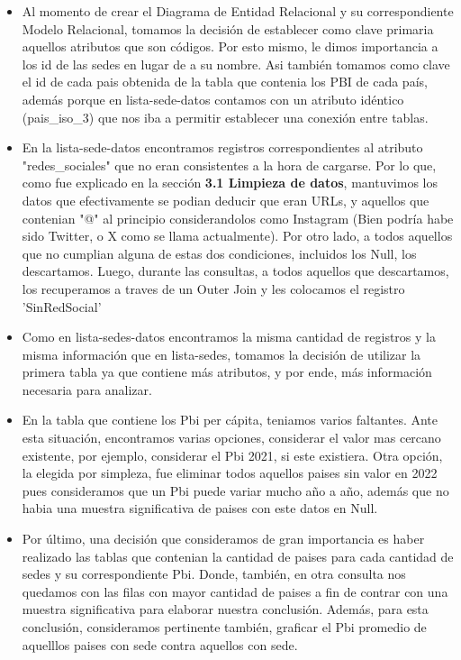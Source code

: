\documentclass[10pt,a4paper]{article}
\begin{document}
\begin{itemize}

    	\item Al momento de crear el Diagrama de Entidad Relacional y su correspondiente Modelo Relacional, tomamos la decisión de establecer como clave primaria aquellos atributos que son códigos. Por esto mismo, le dimos importancia a los id de las sedes en lugar de a su nombre. Asi también tomamos como clave el id de cada pais obtenida de la tabla que contenia los PBI de cada país, además porque en lista-sede-datos contamos con un atributo idéntico (pais\_iso\_3) que nos iba a permitir establecer una conexión entre tablas.

    	\item En la lista-sede-datos encontramos registros correspondientes al atributo "redes\_sociales" que no eran consistentes a la hora de cargarse. Por lo que, como fue explicado en la sección \textbf{3.1 Limpieza de datos}, mantuvimos los datos que efectivamente se podian deducir que eran URLs, y aquellos que contenian "@" al principio considerandolos como Instagram (Bien podría habe sido Twitter, o X como se llama actualmente). Por otro lado, a todos aquellos que no cumplian alguna de estas dos condiciones, incluidos los Null, los descartamos. Luego, durante las consultas, a todos aquellos que descartamos, los recuperamos a traves de un Outer Join y les colocamos el registro 'SinRedSocial'

	\item Como en lista-sedes-datos encontramos la misma cantidad de registros y la misma información que en lista-sedes, tomamos la decisión de utilizar la primera tabla ya que contiene más atributos, y por ende, más información necesaria para analizar.

    	\item En la tabla que contiene los Pbi per cápita, teniamos varios faltantes. Ante esta situación, encontramos varias opciones,
considerar el valor mas cercano existente, por ejemplo, considerar el Pbi 2021, si este existiera. Otra opción, la elegida por simpleza, fue eliminar todos aquellos paises sin valor en 2022 pues consideramos que un Pbi puede variar mucho año a año, además que no habia una muestra significativa de paises con este datos en Null.

	\item Por último, una decisión que consideramos de gran importancia es haber realizado las tablas que contenian la cantidad de paises para cada cantidad de sedes y su correspondiente Pbi. Donde, también, en otra consulta nos quedamos con las filas con mayor cantidad de paises a fin de contrar con una muestra significativa para elaborar nuestra conclusión. Además, para esta conclusión, consideramos pertinente también, graficar el Pbi promedio de aquelllos paises con sede contra aquellos con sede.

\end{itemize}
\end{document}
